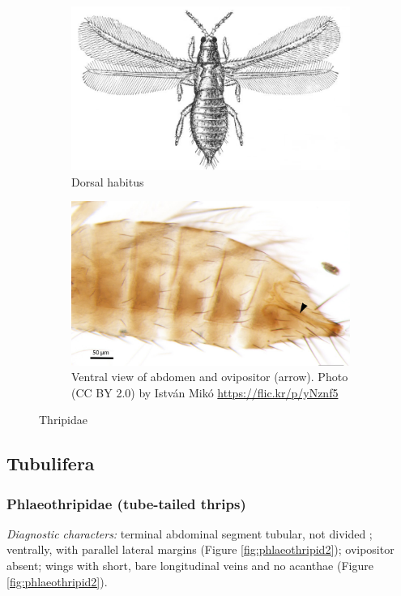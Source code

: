 \documentclass[letterpaper, 11pt]{article}
\begin{document}
\begin{figure}[ht!]
 \centering
 \begin{subfigure}[ht!]{0.45\textwidth}
  \includegraphics[width=\textwidth]{ThripidHabitus}
  \caption{Dorsal habitus \citep[][Fig. 150]{fernald1921applied}}
  \label{fig:thripid1}
 \end{subfigure}
 \qquad
 \begin{subfigure}[ht!]{0.4\textwidth}
  \includegraphics[width=\textwidth]{ThripidOvip}
  \caption{Ventral view of abdomen and ovipositor (arrow). Photo (CC BY 2.0) by Istv\'an Mik\'o \url{https://flic.kr/p/yNznf5}}
  \label{fig:thripid2}
 \end{subfigure}
 \caption{Thripidae}\label{fig:thripid}
\end{figure}

\subsection{Tubulifera}
\subsubsection{Phlaeothripidae (tube-tailed thrips)}
\noindent{}\textit{Diagnostic characters:} terminal abdominal segment tubular, not divided ; ventrally, with parallel lateral margins (Figure \ref{fig:phlaeothripid2}); ovipositor absent; wings with short, bare longitudinal veins and no acanthae (Figure \ref{fig:phlaeothripid2}).\\
\end{document}
